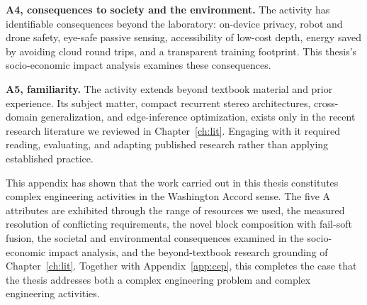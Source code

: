 \textbf{A4, consequences to society and the environment.} The activity
has identifiable consequences beyond the laboratory: on-device
privacy, robot and drone safety, eye-safe passive sensing,
accessibility of low-cost depth, energy saved by avoiding cloud round
trips, and a transparent training footprint. This thesis's
socio-economic impact analysis examines these consequences.

\textbf{A5, familiarity.} The activity extends beyond textbook
material and prior experience. Its subject matter, compact recurrent
stereo architectures, cross-domain generalization, and edge-inference
optimization, exists only in the recent research literature we
reviewed in Chapter~\ref{ch:lit}. Engaging with it required reading,
evaluating, and adapting published research rather than applying
established practice.

This appendix has shown that the work carried out in this thesis
constitutes complex engineering activities in the Washington Accord
sense. The five A attributes are exhibited through the range of
resources we used, the measured resolution of conflicting
requirements, the novel block composition with fail-soft fusion, the
societal and environmental consequences examined in the
socio-economic impact analysis, and the beyond-textbook research
grounding of Chapter~\ref{ch:lit}. Together with Appendix~\ref{app:cep},
this completes the case that the thesis addresses both a complex
engineering problem and complex engineering activities.


